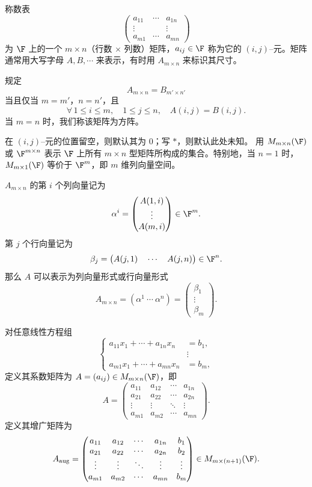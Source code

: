 \begin{definition}
	称数表
	\[
	\begin{pmatrix}
		a_{11}&\cdots&a_{1n}\\
		\vdots&&\vdots\\
		a_{m1}&\cdots&a_{mn}
	\end{pmatrix}
	\]
	为 $\F$ 上的一个 $m\times n$（行数 $\times$ 列数）矩阵，$a_{ij}\in\F$ 称为它的 $(i,j)$--元。矩阵通常用大写字母 $A,B,\cdots$ 来表示，有时用 $A_{m\times n}$ 来标识其尺寸。
	
	规定
	\[
	A_{m\times n}=B_{m'\times n'}
	\]
	当且仅当 $m=m'$，$n=n'$，且
	\[
	\forall\,1\leq i\leq m,
	\quad 1\leq j\leq n,
	\quad A(i,j)=B(i,j).
	\]
	当 $m=n$ 时，我们称该矩阵为方阵。
	
	在 $(i,j)$--元的位置留空，则默认其为 $0$；写 $*$，则默认此处未知。
	用 $M_{m\times n}(\F)$ 或 $\F^{m\times n}$ 表示 $\F$ 上所有 $m\times n$ 型矩阵所构成的集合。特别地，当 $n=1$ 时，$M_{m\times 1}(\F)$ 等价于 $\F^m$，即 $m$ 维列向量空间。
	
	$A_{m\times n}$ 的第 $i$ 个列向量记为
	\[
	\alpha^i=
	\begin{pmatrix}
		A(1,i)\\
		\vdots\\
		A(m,i)
	\end{pmatrix}\in\F^m.
	\]
	第 $j$ 个行向量记为
	\[
	\beta_j=\bigl(A(j,1)\quad \cdots\quad A(j,n)\bigr)\in\F^n.
	\]
	那么 $A$ 可以表示为列向量形式或行向量形式
	\[
	A_{m\times n}=(\alpha^1\ \cdots\ \alpha^n)
	=
	\begin{pmatrix}
		\beta_1\\
		\vdots\\
		\beta_m
	\end{pmatrix}.
	\]
\end{definition}

\begin{definition}
	对任意线性方程组
	\[
	\left\{
	\begin{aligned}
		a_{11}x_1+\cdots+a_{1n}x_n&=b_1,\\
		&\vdots\\
		a_{m1}x_1+\cdots+a_{mn}x_n&=b_m,
	\end{aligned}
	\right.
	\]
	定义其系数矩阵为 $A=(a_{ij})\in M_{m\times n}(\F)$，即
	\[
	A=
	\begin{pmatrix}
		a_{11}&a_{12}&\cdots&a_{1n}\\
		a_{21}&a_{22}&\cdots&a_{2n}\\
		\vdots&\vdots&\ddots&\vdots\\
		a_{m1}&a_{m2}&\cdots&a_{mn}
	\end{pmatrix}.
	\]
	定义其增广矩阵为
	\[
	A_{\mathrm{aug}}=
	\begin{pmatrix}
		a_{11}&a_{12}&\cdots&a_{1n}&b_1\\
		a_{21}&a_{22}&\cdots&a_{2n}&b_2\\
		\vdots&\vdots&\ddots&\vdots&\vdots\\
		a_{m1}&a_{m2}&\cdots&a_{mn}&b_m
	\end{pmatrix}
	\in M_{m\times(n+1)}(\F).
	\]
\end{definition}

